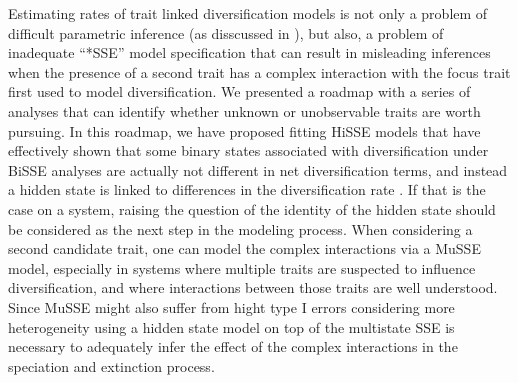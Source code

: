 Estimating rates of trait linked diversification models is not only a problem of difficult parametric inference (as disscussed in  \citet{rabosky_2010, beaulieu_2015}), but also, a problem of inadequate  ``*SSE'' model specification that can result in misleading inferences when the presence of a second trait has a complex interaction with the focus trait first used to model diversification. 
We presented a roadmap with a series of analyses that can identify whether unknown or unobservable traits are worth pursuing. 
In this roadmap, we have proposed fitting HiSSE models that have effectively shown that some binary states associated with diversification under BiSSE analyses are actually not different in net diversification terms, and instead a hidden state is linked to differences in the diversification rate \citep{beaulieu_2016}.  
If that is the case on a system, raising the question of the identity of the hidden state should be considered as the next step in the modeling process. 
When considering  a second candidate trait, one can model the complex interactions via a MuSSE model, especially in systems where multiple traits are suspected to influence diversification, and where interactions between those traits are well understood. 
Since MuSSE might also suffer from hight type I errors considering more heterogeneity using a hidden state model on top of the multistate SSE is necessary to adequately infer the effect of the complex interactions in the speciation and extinction process.



%
%


%


